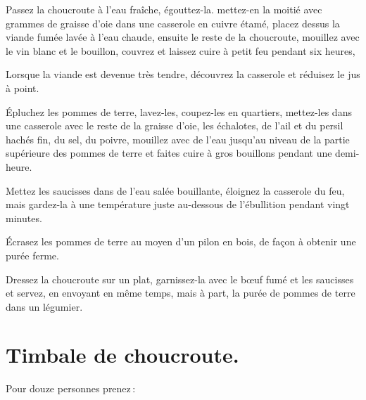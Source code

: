 Passez la choucroute à l'eau fraîche, égouttez-la. mettez-en la moitié avec
{\mmm} grammes de graisse d'oie dans une casserole en cuivre étamé,
placez dessus la viande fumée lavée à l'eau chaude, ensuite le reste de la
choucroute, mouillez avec le vin blanc et le bouillon, couvrez et laissez cuire
à petit feu pendant six heures,

Lorsque la viande est devenue très tendre, découvrez la casserole et réduisez le
jus à point.

Épluchez les pommes de terre, lavez-les, coupez-les en quartiers, mettez-les
dans une casserole avec le reste de la graisse d'oie, les échalotes, de l'ail
et du persil hachés fin, du sel, du poivre, mouillez avec de l’eau jusqu'au
niveau de la partie supérieure des pommes de terre et faites cuire à gros
bouillons pendant une demi-heure.

Mettez les saucisses dans de l'eau salée bouillante, éloignez la casserole du
feu, mais gardez-la à une température juste au-dessous de l'ébullition pendant
vingt minutes.

Écrasez les pommes de terre au moyen d'un pilon en bois, de façon à obtenir une
purée ferme.

Dressez la choucroute sur un plat, garnissez-la avec le bœuf fumé et les
saucisses et servez, en envoyant en même temps, mais à part, la purée de pommes
de terre dans un légumier.

\section*{\centering Timbale de choucroute.}
{}

Pour douze personnes prenez :

